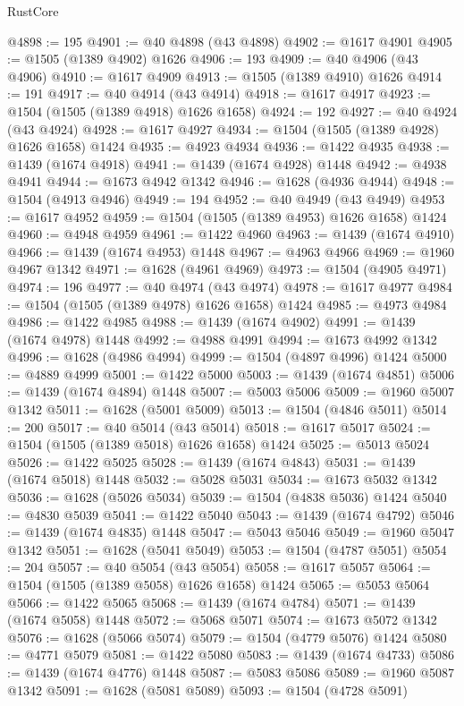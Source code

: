 \begin{lexlean}{RustCore}
\begin{coremodule}
@4898 := 195
@4901 := @40 @4898 (@43 @4898)
@4902 := @1617 @4901
@4905 := @1505 (@1389 @4902) @1626
@4906 := 193
@4909 := @40 @4906 (@43 @4906)
@4910 := @1617 @4909
@4913 := @1505 (@1389 @4910) @1626
@4914 := 191
@4917 := @40 @4914 (@43 @4914)
@4918 := @1617 @4917
@4923 := @1504 (@1505 (@1389 @4918) @1626 @1658)
@4924 := 192
@4927 := @40 @4924 (@43 @4924)
@4928 := @1617 @4927
@4934 := @1504 (@1505 (@1389 @4928) @1626 @1658) @1424
@4935 := @4923 @4934
@4936 := @1422 @4935
@4938 := @1439 (@1674 @4918)
@4941 := @1439 (@1674 @4928) @1448
@4942 := @4938 @4941
@4944 := @1673 @4942 @1342
@4946 := @1628 (@4936 @4944)
@4948 := @1504 (@4913 @4946)
@4949 := 194
@4952 := @40 @4949 (@43 @4949)
@4953 := @1617 @4952
@4959 := @1504 (@1505 (@1389 @4953) @1626 @1658) @1424
@4960 := @4948 @4959
@4961 := @1422 @4960
@4963 := @1439 (@1674 @4910)
@4966 := @1439 (@1674 @4953) @1448
@4967 := @4963 @4966
@4969 := @1960 @4967 @1342
@4971 := @1628 (@4961 @4969)
@4973 := @1504 (@4905 @4971)
@4974 := 196
@4977 := @40 @4974 (@43 @4974)
@4978 := @1617 @4977
@4984 := @1504 (@1505 (@1389 @4978) @1626 @1658) @1424
@4985 := @4973 @4984
@4986 := @1422 @4985
@4988 := @1439 (@1674 @4902)
@4991 := @1439 (@1674 @4978) @1448
@4992 := @4988 @4991
@4994 := @1673 @4992 @1342
@4996 := @1628 (@4986 @4994)
@4999 := @1504 (@4897 @4996) @1424
@5000 := @4889 @4999
@5001 := @1422 @5000
@5003 := @1439 (@1674 @4851)
@5006 := @1439 (@1674 @4894) @1448
@5007 := @5003 @5006
@5009 := @1960 @5007 @1342
@5011 := @1628 (@5001 @5009)
@5013 := @1504 (@4846 @5011)
@5014 := 200
@5017 := @40 @5014 (@43 @5014)
@5018 := @1617 @5017
@5024 := @1504 (@1505 (@1389 @5018) @1626 @1658) @1424
@5025 := @5013 @5024
@5026 := @1422 @5025
@5028 := @1439 (@1674 @4843)
@5031 := @1439 (@1674 @5018) @1448
@5032 := @5028 @5031
@5034 := @1673 @5032 @1342
@5036 := @1628 (@5026 @5034)
@5039 := @1504 (@4838 @5036) @1424
@5040 := @4830 @5039
@5041 := @1422 @5040
@5043 := @1439 (@1674 @4792)
@5046 := @1439 (@1674 @4835) @1448
@5047 := @5043 @5046
@5049 := @1960 @5047 @1342
@5051 := @1628 (@5041 @5049)
@5053 := @1504 (@4787 @5051)
@5054 := 204
@5057 := @40 @5054 (@43 @5054)
@5058 := @1617 @5057
@5064 := @1504 (@1505 (@1389 @5058) @1626 @1658) @1424
@5065 := @5053 @5064
@5066 := @1422 @5065
@5068 := @1439 (@1674 @4784)
@5071 := @1439 (@1674 @5058) @1448
@5072 := @5068 @5071
@5074 := @1673 @5072 @1342
@5076 := @1628 (@5066 @5074)
@5079 := @1504 (@4779 @5076) @1424
@5080 := @4771 @5079
@5081 := @1422 @5080
@5083 := @1439 (@1674 @4733)
@5086 := @1439 (@1674 @4776) @1448
@5087 := @5083 @5086
@5089 := @1960 @5087 @1342
@5091 := @1628 (@5081 @5089)
@5093 := @1504 (@4728 @5091)

\end{coremodule}
\end{lexlean}
